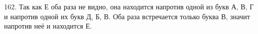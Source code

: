 162. Так как Е оба раза не видно, она находится напротив одной из букв А, В, Г и напротив одной их букв Д, Б, В. Оба раза встречается только буква В, значит напротив неё и находится Е.\\
